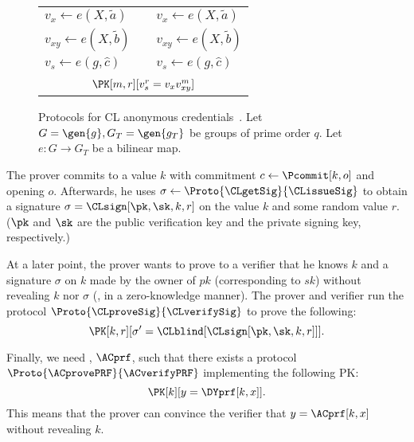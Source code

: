 \begin{figure}
\begin{tabular}{lcl}
    \(v_x\gets e(X, \tilde a)\)
    &
    & \(v_x\gets e(X, \tilde a)\)

    \\

    \(v_{xy}\gets e(X, \tilde b)\)
    &
    & \(v_{xy}\gets e(X, \tilde b)\)

    \\

    \(v_s\gets e(g, \hat c)\)
    &
    & \(v_s\gets e(g, \hat c)\)

    \\\\

    \multicolumn{3}{c}{\(\PK[m,r][v_s^r = v_x v_{xy}^m]\)}

    \\\bottomrule
  \end{tabular}
  \caption{\label{ACacAlg}%
    Protocols for CL anonymous credentials~\cite{CLsignatures}.
    Let \(G = \gen{g}, G_T = \gen{g_T}\) be groups of prime order \(q\).
    Let \(e\colon G\to G_T\) be a bilinear map.
  }
\end{figure}

The prover commits to a value \(k\) with commitment \(c\gets \Pcommit[k, o]\) 
and opening \(o\).
Afterwards, he uses \(\sigma\gets \Proto{\CLgetSig}{\CLissueSig}\) to obtain a 
signature \(\sigma = \CLsign[\pk, \sk, k, r]\) on the value \(k\) and some 
random value \(r\).
(\(\pk\) and \(\sk\) are the public verification key and the private signing 
key, respectively.)

At a later point, the prover wants to prove to a verifier that he knows \(k\) and a signature \(\sigma\) on \(k\) made by the owner of \(pk\) (corresponding to \(sk\)) without revealing \(k\) nor \(\sigma\) (\ie, in a zero-knowledge manner).
The prover and verifier run the protocol \(\Proto{\CLproveSig}{\CLverifySig}\) 
to prove the following:
\begin{equation*}
  \PK[k, r][\sigma' = \CLblind[\CLsign[\pk, \sk, k, r]]].
\end{equation*}

Finally, we need , \(\ACprf\), such that there exists a protocol 
\(\Proto{\ACprovePRF}{\ACverifyPRF}\) implementing the following \ac{PK}:
\begin{equation*}
  \PK[k][y = \DYprf[k, x]].
\end{equation*}
This means that the prover can convince the verifier that \(y = \ACprf[k, x]\) 
without revealing \(k\).

